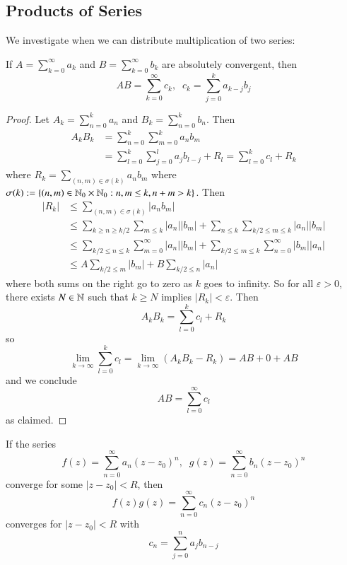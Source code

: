 \subsection{Products of Series}

We investigate when we can distribute multiplication of two series:

\begin{proposition}\label{prop:3.3.4}
    If $A = \sum_{k=0}^{\infty}a_k$ and $B = \sum_{k=0}^{\infty}b_k$ are absolutely convergent, then \begin{equation*}
        AB = \sum_{k=0}^{\infty}c_k,\;\;c_k = \sum_{j=0}^ka_{k-j}b_j
    \end{equation*}
\end{proposition}
\begin{proof}
    Let $A_k = \sum_{n=0}^ka_n$ and $B_k = \sum_{n=0}^kb_n$. Then \begin{align*}
        A_kB_k &= \sum_{n=0}^k\sum_{m=0}^ka_nb_m \\
        &= \sum_{l=0}^k\sum_{j=0}^la_jb_{l-j} + R_l = \sum_{l=0}^kc_l+R_k
    \end{align*}
    where $R_k = \sum_{(n,m) \in \sigma(k)}a_nb_m$ where $\sigma(k) := \{(n,m) \in \mathbb N_0\times \mathbb N_0:n,m\leq k,n+m > k\}$. Then \begin{align*}
        |R_k| &\leq \sum_{(n,m) \in \sigma(k)}|a_nb_m| \\
        &\leq \sum_{k\geq n\geq k/2}\sum_{m\leq k}|a_n||b_m| + \sum_{n\leq k}\sum_{k/2\leq m\leq k}|a_n||b_m| \\
        &\leq \sum_{k/2\leq n \leq k}\sum_{m=0}^{\infty}|a_n||b_m| + \sum_{k/2\leq m\leq k}\sum_{n=0}^{\infty}|b_m||a_n| \\
        &\leq A \sum_{k/2\leq m}|b_m| + B\sum_{k/2\leq n}|a_n|
    \end{align*}
    where both sums on the right go to zero as $k$ goes to infinity. So for all $\varepsilon > 0$, there exists $N \in \mathbb N$ such that $k \geq N$ implies $|R_k| < \varepsilon$. Then $$A_kB_k = \sum_{l=0}^kc_l+R_k$$ so $$\lim\limits_{k\rightarrow \infty}\sum_{l=0}^kc_l = \lim\limits_{k\rightarrow \infty}(A_kB_k-R_k) = AB+0 + AB$$ and we conclude $$AB = \sum_{l=0}^{\infty}c_l$$ as claimed.
\end{proof}

\begin{corollary}
    If the series $$f(z) = \sum_{n=0}^{\infty}a_n(z-z_0)^n,\;\;g(z) = \sum_{n=0}^{\infty}b_n(z-z_0)^n$$ converge for some $|z-z_0| < R$, then $$f(z)g(z) = \sum_{n=0}^{\infty}c_n(z-z_0)^n$$ converges for $|z-z_0| < R$ with $$c_n = \sum_{j=0}^na_jb_{n-j}$$
\end{corollary}

